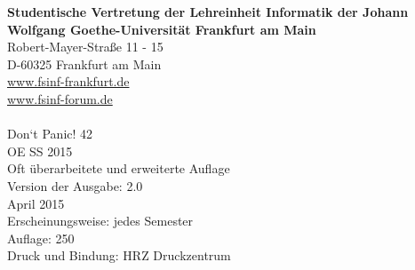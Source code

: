 \spaltenanfang
\noindent\textbf{Studentische Vertretung der Lehreinheit Informatik der Johann Wolfgang Goethe-Universität Frankfurt am Main}\\
Robert-Mayer-Straße 11 - 15\\
D-60325 Frankfurt am Main\\
\url{www.fsinf-frankfurt.de}\\
\url{www.fsinf-forum.de}\\
\emailfachschaft\\
Don‘t Panic! 42\\
OE SS 2015\\
Oft überarbeitete und erweiterte Auflage\\
Version der Ausgabe: 2.0\\
April 2015\\
Erscheinungsweise: jedes Semester\\
Auflage: 250\\
Druck und Bindung: HRZ Druckzentrum

\spaltenende
